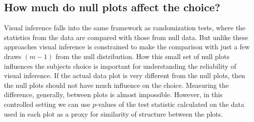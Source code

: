 \documentclass[12pt]{article}
\newcommand{\green}[1]{{\color{green} #1}} %
\begin{document}




\subsection{How much do null plots affect the choice?}

 Visual inference falls into the same framework as randomization tests, where the statistics from the data are compared with those from null data. 
 But unlike these approaches visual inference is constrained to make the comparison with just a few draws $(m-1)$ from the null distribution. How this small set of null plots influences the subjects choice is important for understanding the reliability of visual inference. If the actual data plot is very different from the null plots, then the null plots should not have much influence on the choice. Measuring the difference, generally, between  plots is almost impossible. However,  in this controlled setting we can use $p$-values of the test statistic calculated on the data used in each plot as a proxy for similarity of structure between the plots. 
\end{document}

